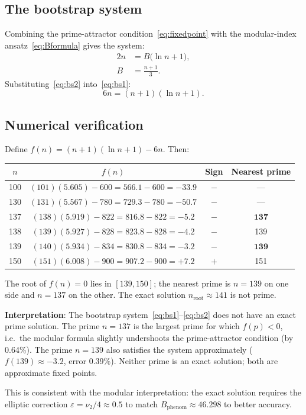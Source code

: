 \documentclass[12pt,a4paper]{article}
\theoremstyle{definition}
\theoremstyle{remark}
\begin{document}
\subsection{The bootstrap system}

Combining the prime-attractor condition~\eqref{eq:fixedpoint} with the
modular-index ansatz~\eqref{eq:Bformula} gives the system:
\begin{align}
  2n &= B\bigl(\ln n + 1\bigr), \label{eq:bs1} \\
  B  &= \frac{n+1}{3}.           \label{eq:bs2}
\end{align}
Substituting~\eqref{eq:bs2} into~\eqref{eq:bs1}:
\begin{equation}
  6n = (n+1)(\ln n + 1).
  \label{eq:bootstrap}
\end{equation}

\subsection{Numerical verification}

Define $f(n) = (n+1)(\ln n + 1) - 6n$.  Then:

\begin{center}
\begin{tabular}{cccc}
\toprule
$n$ & $f(n)$ & Sign & Nearest prime \\
\midrule
100 & $(101)(5.605) - 600 = 566.1 - 600 = -33.9$ & $-$ & --- \\
130 & $(131)(5.567) - 780 = 729.3 - 780 = -50.7$ & $-$ & --- \\
137 & $(138)(5.919) - 822 = 816.8 - 822 = -5.2$ & $-$ & $\mathbf{137}$ \\
138 & $(139)(5.927) - 828 = 823.8 - 828 = -4.2$ & $-$ & 139 \\
139 & $(140)(5.934) - 834 = 830.8 - 834 = -3.2$ & $-$ & $\mathbf{139}$ \\
150 & $(151)(6.008) - 900 = 907.2 - 900 = +7.2$ & $+$ & 151 \\
\bottomrule
\end{tabular}
\end{center}

The root of $f(n) = 0$ lies in $[139, 150]$; the nearest prime is
$n = 139$ on one side and $n = 137$ on the other.  The exact solution
$n_{\mathrm{root}} \approx 141$ is not prime.

\begin{insightbox}
\textbf{Interpretation}: The bootstrap system~\eqref{eq:bs1}--\eqref{eq:bs2}
does not have an exact prime solution.  The prime $n = 137$ is the largest
prime for which $f(p) < 0$, i.e.\ the modular formula slightly undershoots the
prime-attractor condition (by 0.64\%).  The prime $n = 139$ also satisfies the
system approximately ($f(139) \approx -3.2$, error 0.39\%).  Neither prime is
an exact solution; both are approximate fixed points.

This is consistent with the modular interpretation: the exact solution requires
the elliptic correction $\varepsilon = \nu_2/4 \approx 0.5$ to match
$B_{\mathrm{phenom}} \approx 46.298$ to better accuracy.
\end{insightbox}
\end{document}

